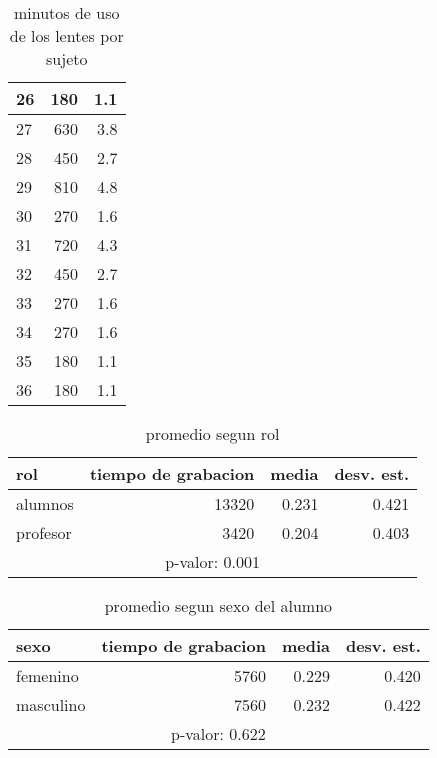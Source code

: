 \documentclass[spanish]{article}
\begin{document}
\begin{table}[h!]
\begin{center}
\begin{tabular}{|l|r|r|}
    26 &              180 &           1.1\\ \hline
    27 &              630 &           3.8\\ \hline
    28 &              450 &           2.7\\ \hline
    29 &              810 &           4.8\\ \hline
    30 &              270 &           1.6\\ \hline
    31 &              720 &           4.3\\ \hline
    32 &              450 &           2.7\\ \hline
    33 &              270 &           1.6\\ \hline
    34 &              270 &           1.6\\ \hline
    35 &              180 &           1.1\\ \hline
    36 &              180 &           1.1\\ \hline
\end{tabular}
\caption{minutos de uso de los lentes por sujeto}
\end{center}
\end{table}

\begin{table}[h!]
\begin{center}
\begin{tabular}{|l|r|r|r|}
\hline
rol      & tiempo de grabacion & media          & desv. est.    \\ \hline
alumnos  &               13320 &          0.231 &          0.421\\ \hline
profesor &                3420 &          0.204 &          0.403\\ \hline
\multicolumn{4}{|c|}{p-valor: 0.001} \\ \hline
\end{tabular}
\caption{promedio segun rol}
\end{center}
\end{table}

\begin{table}[h!]
\begin{center}
\begin{tabular}{|l|r|r|r|}
\hline
sexo      & tiempo de grabacion & media          & desv. est.    \\ \hline
femenino  &                5760 &          0.229 &          0.420\\ \hline
masculino &                7560 &          0.232 &          0.422\\ \hline
\multicolumn{4}{|c|}{p-valor: 0.622} \\ \hline
\end{tabular}
\caption{promedio segun sexo del alumno}
\end{center}
\end{table}
\end{document}
